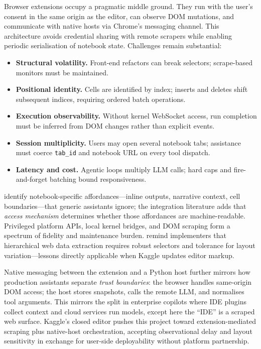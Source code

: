 Browser extensions occupy a pragmatic middle ground. They run with the user's consent in the same origin as the editor, can observe \ac{DOM} mutations, and communicate with native hosts via Chrome's messaging channel. This architecture avoids credential sharing with remote scrapers while enabling periodic serialisation of notebook state. Challenges remain substantial:

\begin{itemize}
  \item \textbf{Structural volatility.} Front-end refactors can break selectors; scrape-based monitors must be maintained.
  \item \textbf{Positional identity.} Cells are identified by index; inserts and deletes shift subsequent indices, requiring ordered batch operations.
  \item \textbf{Execution observability.} Without kernel WebSocket access, run completion must be inferred from \ac{DOM} changes rather than explicit events.
  \item \textbf{Session multiplicity.} Users may open several notebook tabs; assistance must coerce \texttt{tab\_id} and notebook URL on every tool dispatch.
  \item \textbf{Latency and cost.} Agentic loops multiply \ac{LLM} calls; hard caps and fire-and-forget batching bound responsiveness.
\end{itemize}

\textcite{mcnutt2023notebookassistants} identify notebook-specific affordances---inline outputs, narrative context, cell boundaries---that generic assistants ignore; the integration literature adds that \emph{access mechanism} determines whether those affordances are machine-readable. Privileged platform APIs, local kernel bridges, and \ac{DOM} scraping form a spectrum of fidelity and maintenance burden. \textcite{chasins2018roussillon} remind implementers that hierarchical web data extraction requires robust selectors and tolerance for layout variation---lessons directly applicable when Kaggle updates editor markup.

Native messaging between the extension and a Python host further mirrors how production assistants separate \emph{trust boundaries}: the browser handles same-origin \ac{DOM} access; the host stores snapshots, calls the remote \ac{LLM}, and normalises tool arguments. This mirrors the split in enterprise copilots where IDE plugins collect context and cloud services run models, except here the ``IDE'' is a scraped web surface. Kaggle's closed editor pushes this project toward extension-mediated scraping plus native-host orchestration, accepting observational delay and layout sensitivity in exchange for user-side deployability without platform partnership.

